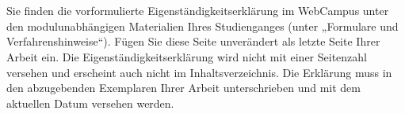 \pagestyle{empty}
\chapter*{} %
\thispagestyle{empty}

Sie finden die vorformulierte Eigenständigkeitserklärung im WebCampus unter
den modulunabhängigen Materialien Ihres Studienganges (unter „Formulare und
Verfahrenshinweise“). Fügen Sie diese Seite unverändert als letzte Seite Ihrer
Arbeit ein. Die Eigenständigkeitserklärung wird nicht mit einer Seitenzahl
versehen und erscheint auch nicht im Inhaltsverzeichnis. Die Erklärung muss
in den abzugebenden Exemplaren Ihrer Arbeit unterschrieben und mit dem
aktuellen Datum versehen werden.

% 
